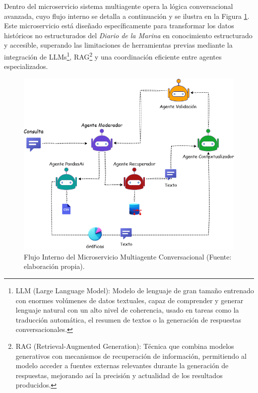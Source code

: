 Dentro del microservicio sistema multiagente opera la lógica conversacional avanzada, cuyo flujo interno se detalla a continuación y se ilustra en la Figura \ref{fig:flujo_mas_interno}. Este microservicio está diseñado específicamente para transformar los datos históricos no estructurados del \textit{Diario de la Marina} en conocimiento estructurado y accesible, superando las limitaciones de herramientas previas mediante la integración de LLMs\footnote{LLM (Large Language Model): Modelo de lenguaje de gran tamaño entrenado con enormes volúmenes de datos textuales, capaz de comprender y generar lenguaje natural con un alto nivel de coherencia, usado en tareas como la traducción automática, el resumen de textos o la generación de respuestas conversacionales.}, RAG\footnote{RAG (Retrieval-Augmented Generation): Técnica que combina modelos generativos con mecanismos de recuperación de información, permitiendo al modelo acceder a fuentes externas relevantes durante la generación de respuestas, mejorando así la precisión y actualidad de los resultados producidos.} y una coordinación eficiente entre agentes especializados.

\begin{figure}[htbp] 
	\centering
	\includegraphics[width=1\textwidth]{images/mas-final.png} 
	\caption{Flujo Interno del Microservicio Multiagente Conversacional (Fuente: elaboración propia).}
	\label{fig:flujo_mas_interno}
\end{figure}

